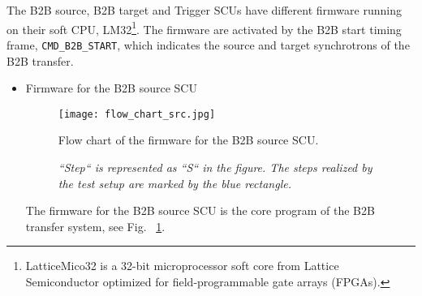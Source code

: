 The B2B source, B2B target and Trigger SCUs have different firmware running on their soft \gls{CPU}, LM32\footnote{LatticeMico32 is a 32-bit microprocessor soft core from Lattice Semiconductor optimized for field-programmable gate arrays (\gls{FPGA}s).}. The firmware are activated by the  B2B start timing frame, \verb|CMD_B2B_START|, which indicates the source and target synchrotrons of the B2B transfer. 
\begin{itemize}
\item Firmware for the B2B source SCU
\begin{figure}[!htb]
   \centering   
   \texttt{[image: flow\_chart\_src.jpg]}
   \caption{Flow chart of the firmware for the B2B source SCU.}
   \caption*{\textsl{\small{``Step`` is represented as ``S`` in the figure. The steps realized by the test setup are marked by the blue rectangle. }}}
   \label{flow_chart_src}
\end{figure}

The firmware for the B2B source SCU is the core program of the B2B transfer system, see Fig. ~\ref{flow_chart_src}. 


\end{itemize}
